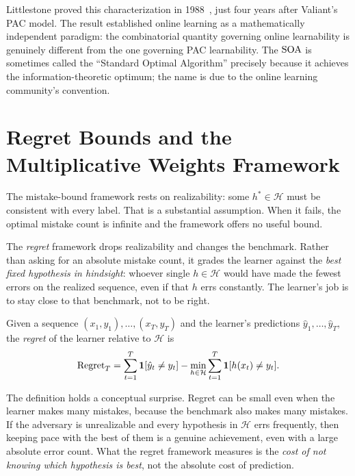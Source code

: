 \begin{historical}
Littlestone proved this characterization in 1988~\cite{Littlestone1988}, just four years after Valiant's PAC model. The result established online learning as a mathematically independent paradigm: the combinatorial quantity governing online learnability is genuinely different from the one governing PAC learnability. The $\mathrm{SOA}$ is sometimes called the ``Standard Optimal Algorithm'' precisely because it achieves the information-theoretic optimum; the name is due to the online learning community's convention.
\end{historical}


\section{Regret Bounds and the Multiplicative Weights Framework}
\label{sec:regret}

The mistake-bound framework rests on realizability: some $h^* \in \mathcal{H}$ must be consistent with every label. That is a substantial assumption. When it fails, the optimal mistake count is infinite and the framework offers no useful bound.

The \emph{regret} framework drops realizability and changes the benchmark. Rather than asking for an absolute mistake count, it grades the learner against the \emph{best fixed hypothesis in hindsight}: whoever single $h \in \mathcal{H}$ would have made the fewest errors on the realized sequence, even if that $h$ errs constantly. The learner's job is to stay close to that benchmark, not to be right.

\begin{defn}[Regret]
\label{def:regret}
Given a sequence $(x_1, y_1), \ldots, (x_T, y_T)$ and the learner's predictions $\hat{y}_1, \ldots, \hat{y}_T$, the \emph{regret} of the learner relative to $\mathcal{H}$ is
\[
\mathrm{Regret}_T = \sum_{t=1}^T \mathbf{1}[\hat{y}_t \neq y_t] - \min_{h \in \mathcal{H}} \sum_{t=1}^T \mathbf{1}[h(x_t) \neq y_t].
\]
\end{defn}

The definition holds a conceptual surprise. Regret can be small even when the learner makes many mistakes, because the benchmark also makes many mistakes. If the adversary is unrealizable and every hypothesis in $\mathcal{H}$ errs frequently, then keeping pace with the best of them is a genuine achievement, even with a large absolute error count. What the regret framework measures is the \emph{cost of not knowing which hypothesis is best}, not the absolute cost of prediction.

